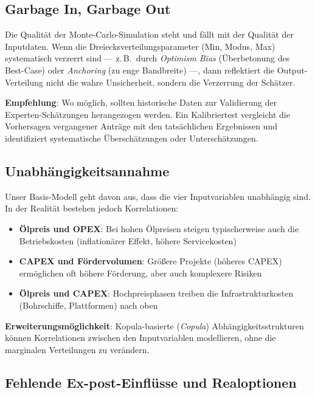 \documentclass[12pt,a4paper]{article}
\begin{document}
\subsection{Garbage In, Garbage Out}

Die Qualität der Monte-Carlo-Simulation steht und fällt mit der Qualität der Inputdaten. Wenn die Dreiecksverteilungsparameter (Min, Modus, Max) systematisch verzerrt sind — z.\,B.\ durch \textit{Optimism Bias} (Überbetonung des Best-Case) oder \textit{Anchoring} (zu enge Bandbreite) —, dann reflektiert die Output-Verteilung nicht die wahre Unsicherheit, sondern die Verzerrung der Schätzer.

\textbf{Empfehlung}: Wo möglich, sollten historische Daten zur Validierung der Experten-Schätzungen herangezogen werden. Ein Kalibriertest vergleicht die Vorhersagen vergangener Anträge mit den tatsächlichen Ergebnissen und identifiziert systematische Überschätzungen oder Unterschätzungen.

\subsection{Unabhängigkeitsannahme}

Unser Basis-Modell geht davon aus, dass die vier Inputvariablen unabhängig sind. In der Realität bestehen jedoch Korrelationen:

\begin{itemize}[itemsep=2pt]
  \item \textbf{Ölpreis und OPEX}: Bei hohen Ölpreisen steigen typischerweise auch die Betriebskosten (inflationärer Effekt, höhere Servicekosten)
  \item \textbf{CAPEX und Fördervolumen}: Größere Projekte (höheres CAPEX) ermöglichen oft höhere Förderung, aber auch komplexere Risiken
  \item \textbf{Ölpreis und CAPEX}: Hochpreisphasen treiben die Infrastrukturkosten (Bohrschiffe, Plattformen) nach oben
\end{itemize}

\textbf{Erweiterungsmöglichkeit}: Kopula-basierte (\textit{Copula}) Abhängigkeitsstrukturen können Korrelationen zwischen den Inputvariablen modellieren, ohne die marginalen Verteilungen zu verändern.

\subsection{Fehlende Ex-post-Einflüsse und Realoptionen}
\end{document}
